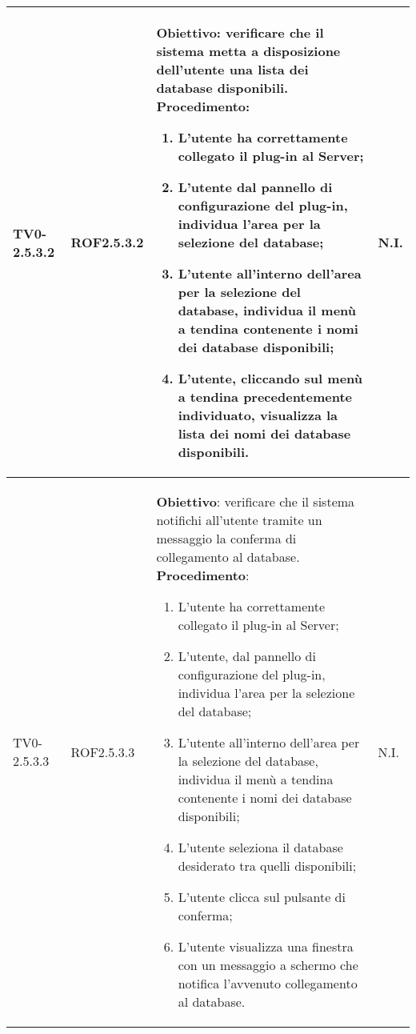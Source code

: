 \begin{longtable}{|C{.15\textwidth}|C{.13\textwidth}|m{.52\textwidth}|C{.08\textwidth}|}
TV0-2.5.3.2 & ROF2.5.3.2 &
	\textbf{Obiettivo}: verificare che il sistema metta a disposizione dell'utente una lista dei database disponibili. \newline
	\textbf{Procedimento}:
	\begin{enumerate}
		\item L'utente ha correttamente collegato il plug-in al Server;
		\item L'utente dal pannello di configurazione del plug-in, individua l'area per la selezione del database;
		\item L'utente all'interno dell'area per la selezione del database, individua il menù a tendina contenente i nomi dei database disponibili;
		\item L'utente, cliccando sul menù a tendina precedentemente individuato, visualizza la lista dei nomi dei database disponibili.	\end{enumerate} & N.I. \\
\hline

TV0-2.5.3.3 & ROF2.5.3.3 &
	\textbf{Obiettivo}: verificare che il sistema notifichi all'utente tramite un messaggio la conferma di collegamento al database. \newline
	\textbf{Procedimento}:
	\begin{enumerate}
		\item L'utente ha correttamente collegato il plug-in al Server;
		\item L'utente, dal pannello di configurazione del plug-in, individua l'area per la selezione del database;
		\item L'utente all'interno dell'area per la selezione del database, individua il menù a tendina contenente i nomi dei database disponibili;
		\item L'utente seleziona il database desiderato tra quelli disponibili;
		\item L'utente clicca sul pulsante di conferma;
		\item L'utente visualizza una finestra con un messaggio a schermo che notifica l'avvenuto collegamento al database.		
			\end{enumerate} & N.I. \\
\hline


\end{longtable}
